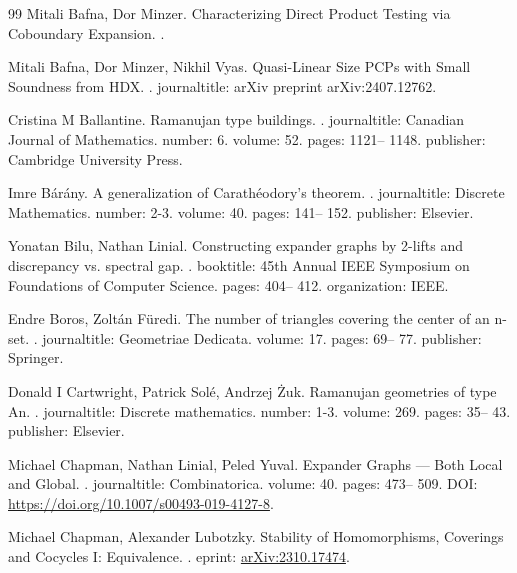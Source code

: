 \documentclass[10pt,a4paper]{article}
\theoremstyle{definition}
\theoremstyle{remark}
\numberwithin{equation}{section}
\begin{document}
\begin{thebibliography}{99}
Mitali Bafna, Dor Minzer.
\newblock Characterizing Direct Product Testing via Coboundary Expansion.
.

Mitali Bafna, Dor Minzer, Nikhil Vyas.
\newblock Quasi-Linear Size PCPs with Small Soundness from HDX.
.
\newblock journaltitle: arXiv preprint arXiv:2407.12762.

Cristina M Ballantine.
\newblock Ramanujan type buildings.
.
\newblock journaltitle: Canadian Journal of Mathematics.
\newblock number: 6.
\newblock volume: 52.
\newblock pages: 1121-- 1148.
\newblock publisher: Cambridge University Press.

Imre Bárány.
\newblock A generalization of Carathéodory's theorem.
.
\newblock journaltitle: Discrete Mathematics.
\newblock number: 2-3.
\newblock volume: 40.
\newblock pages: 141-- 152.
\newblock publisher: Elsevier.

Yonatan Bilu, Nathan Linial.
\newblock Constructing expander graphs by 2-lifts and discrepancy vs. spectral gap.
.
\newblock booktitle: 45th Annual IEEE Symposium on Foundations of Computer Science.
\newblock pages: 404-- 412.
\newblock organization: IEEE.

Endre Boros, Zoltán Füredi.
\newblock The number of triangles covering the center of an n-set.
.
\newblock journaltitle: Geometriae Dedicata.
\newblock volume: 17.
\newblock pages: 69-- 77.
\newblock publisher: Springer.

Donald I Cartwright, Patrick Solé, Andrzej Żuk.
\newblock Ramanujan geometries of type An.
.
\newblock journaltitle: Discrete mathematics.
\newblock number: 1-3.
\newblock volume: 269.
\newblock pages: 35-- 43.
\newblock publisher: Elsevier.

Michael Chapman, Nathan Linial, Peled Yuval.
\newblock Expander Graphs — Both Local and Global.
.
\newblock journaltitle: Combinatorica.
\newblock volume: 40.
\newblock pages: 473-- 509.
\newblock DOI: \url{https://doi.org/10.1007/s00493-019-4127-8}.

Michael Chapman, Alexander Lubotzky.
\newblock Stability of Homomorphisms, Coverings and Cocycles I: Equivalence.
.
\newblock eprint: \url{arXiv:2310.17474}.


\end{thebibliography}
\end{document}

